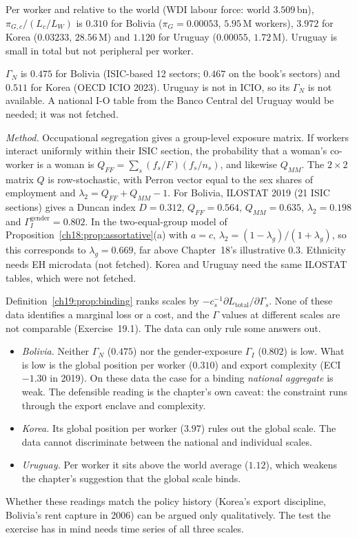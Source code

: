 \documentclass[../solutions_manual.tex]{subfiles}
\begin{document}
 Per worker and relative to the world (WDI labour force: world $3.509$\,bn), $\pi_{G,c}/(L_c/L_W)$ is $0.310$ for Bolivia ($\pi_G = 0.00053$, $5.95$\,M workers), $3.972$ for Korea ($0.03233$, $28.56$\,M) and $1.120$ for Uruguay ($0.00055$, $1.72$\,M). Uruguay is small in total but not peripheral per worker.

 $\Gamma_N$ is $0.475$ for Bolivia (ISIC-based 12 sectors; $0.467$ on the book's sectors) and $0.511$ for Korea (OECD ICIO 2023). Uruguay is not in ICIO, so its $\Gamma_N$ is not available. A national I-O table from the Banco Central del Uruguay would be needed; it was not fetched.

 \emph{Method.} Occupational segregation gives a group-level exposure matrix. If workers interact uniformly within their ISIC section, the probability that a woman's co-worker is a woman is $Q_{FF} = \sum_s (f_s/F)(f_s/n_s)$, and likewise $Q_{MM}$. The $2\times2$ matrix $Q$ is row-stochastic, with Perron vector equal to the sex shares of employment and $\lambda_2 = Q_{FF} + Q_{MM} - 1$. For Bolivia, ILOSTAT 2019 (21 ISIC sections) gives a Duncan index $D = 0.312$, $Q_{FF} = 0.564$, $Q_{MM} = 0.635$, $\lambda_2 = 0.198$ and $\Gamma_I^{\text{gender}} = 0.802$. In the two-equal-group model of Proposition~\ref{ch18:prop:assortative}(a) with $a = c$, $\lambda_2 = (1-\lambda_g)/(1+\lambda_g)$, so this corresponds to $\lambda_g = 0.669$, far above Chapter~18's illustrative $0.3$. Ethnicity needs EH microdata (not fetched). Korea and Uruguay need the same ILOSTAT tables, which were not fetched.

 Definition~\ref{ch19:prop:binding} ranks scales by $-c_s^{-1}\partial L_{\text{total}}/\partial\Gamma_s$. None of these data identifies a marginal loss or a cost, and the $\Gamma$ values at different scales are not comparable (Exercise~19.1). The data can only rule some answers out.
\begin{itemize}
\item \emph{Bolivia.} Neither $\Gamma_N$ ($0.475$) nor the gender-exposure $\Gamma_I$ ($0.802$) is low. What is low is the global position per worker ($0.310$) and export complexity (ECI $-1.30$ in 2019). On these data the case for a binding \emph{national aggregate} is weak. The defensible reading is the chapter's own caveat: the constraint runs through the export enclave and complexity.
\item \emph{Korea.} Its global position per worker ($3.97$) rules out the global scale. The data cannot discriminate between the national and individual scales.
\item \emph{Uruguay.} Per worker it sits above the world average ($1.12$), which weakens the chapter's suggestion that the global scale binds.
\end{itemize}
Whether these readings match the policy history (Korea's export discipline, Bolivia's rent capture in 2006) can be argued only qualitatively. The test the exercise has in mind needs time series of all three scales.
\end{document}

